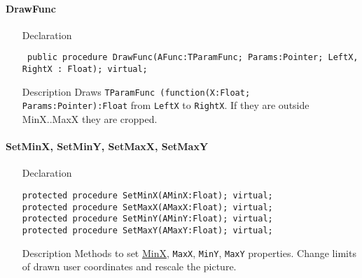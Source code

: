 \documentclass[12pt,a4paper,oneside]{report}
\newcommand{\declarationitem}[1]{{\addfontfeatures{FakeSlant} #1}}
\newcommand{\descriptiontitle}[1]{{\addfontfeatures{FakeSlant}#1}}
\newcommand{\code}[1]{\texttt{#1}}
\begin{document}
\paragraph{DrawFunc}\hspace*{\fill}\label{lmcoordsys.TCoordSys-DrawFunc}
\begin{itemize}\item[\declarationitem{Declaration}\hfill]
\begin{flushleft}
\code{
public procedure DrawFunc(AFunc:TParamFunc; Params:Pointer; LeftX, RightX : Float); virtual;}
\end{flushleft}
\item[\descriptiontitle{Description}]
Draws \code{TParamFunc (function(X:Float; Params:Pointer):Float} from \code{LeftX} to \code{RightX}. If they are outside MinX..MaxX they are cropped.
\end{itemize}
\paragraph{SetMinX, SetMinY, SetMaxX, SetMaxY}\hspace*{\fill}
\begin{itemize}\item[\declarationitem{Declaration}\hfill]
	\label{lmcoordsys.TCoordSys-SetMinX}
	\label{lmcoordsys.TCoordSys-SetMaxX}
	\label{lmcoordsys.TCoordSys-SetMinY}
	\label{lmcoordsys.TCoordSys-SetMaxY}
	\begin{flushleft}
		\code{protected procedure SetMinX(AMinX:Float); virtual;\\
			protected procedure SetMaxX(AMaxX:Float); virtual;\\
			protected procedure SetMinY(AMinY:Float); virtual;\\
			protected procedure SetMaxY(AMaxY:Float); virtual;}
	\end{flushleft}
	\item[\descriptiontitle{Description}] Methods to set \hyperref[lmcoordsys.TCoordSys-MinX]{MinX}, \code{MaxX}, \code{MinY}, \code{MaxY} properties. Change limits of drawn user coordinates and rescale the picture.
\end{itemize}
\end{document}
